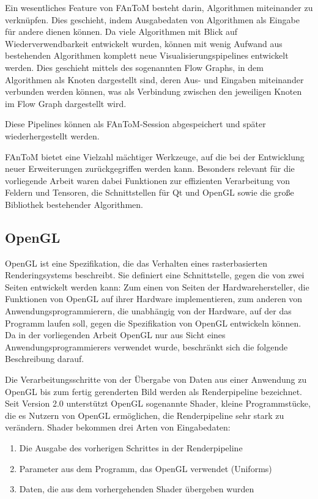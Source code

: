 \documentclass[a4paper,fontsize=12pt,toc=bib,parskip=half,ngerman]{scrartcl}
\begin{document}
Ein wesentliches Feature von FAnToM besteht darin, Algorithmen miteinander zu verkn\"upfen. Dies geschieht, indem Ausgabedaten von Algorithmen als Eingabe f\"ur andere dienen k\"onnen. Da viele Algorithmen mit Blick auf Wiederverwendbarkeit entwickelt wurden, k\"onnen mit wenig Aufwand aus bestehenden Algorithmen komplett neue Visualisierungspipelines entwickelt werden. Dies geschieht mittels des sogenannten \glq Flow Graphs\grq{}, in dem Algorithmen als Knoten dargestellt sind, deren Aus- und Eingaben miteinander verbunden werden k\"onnen, was als Verbindung zwischen den jeweiligen Knoten im Flow Graph dargestellt wird.

Diese Pipelines k\"onnen als FAnToM-Session abgespeichert und sp\"ater wiederhergestellt werden.

FAnToM bietet eine Vielzahl m\"achtiger Werkzeuge, auf die bei der Entwicklung neuer Erweiterungen zur\"uckgegriffen werden kann. Besonders relevant f\"ur die vorliegende Arbeit waren dabei Funktionen zur effizienten Verarbeitung von Feldern und Tensoren, die Schnittstellen f\"ur Qt und OpenGL sowie die gro{\ss}e Bibliothek bestehender Algorithmen.

\subsection{OpenGL}
\label{sec:OpenGL}
OpenGL\cite{openglWebsite} ist eine Spezifikation, die das Verhalten eines rasterbasierten Renderingsystems beschreibt. Sie definiert eine Schnittstelle, gegen die von zwei Seiten entwickelt werden kann: Zum einen von Seiten der Hardwarehersteller, die Funktionen von OpenGL auf ihrer Hardware implementieren, zum anderen von Anwendungsprogrammierern, die unabh\"angig von der Hardware, auf der das Programm laufen soll, gegen die Spezifikation von OpenGL entwickeln k\"onnen. Da in der vorliegenden Arbeit OpenGL nur aus Sicht eines Anwendungsprogrammierers verwendet wurde, beschr\"ankt sich die folgende Beschreibung darauf.

Die Verarbeitungsschritte von der \"Ubergabe von Daten aus einer Anwendung zu OpenGL bis zum fertig gerenderten Bild werden als Renderpipeline bezeichnet. Seit Version 2.0 unterst\"utzt OpenGL sogenannte \glq Shader\grq{}, kleine Programmst\"ucke, die es Nutzern von OpenGL erm\"oglichen, die Renderpipeline sehr stark zu ver\"andern. Shader bekommen drei Arten von Eingabedaten:

\begin{enumerate}
	\item Die Ausgabe des vorherigen Schrittes in der Renderpipeline
	\item Parameter aus dem Programm, das OpenGL verwendet (\glq Uniforms\grq{})
	\item Daten, die aus dem vorhergehenden Shader \"ubergeben wurden
\end{enumerate}
\end{document}
